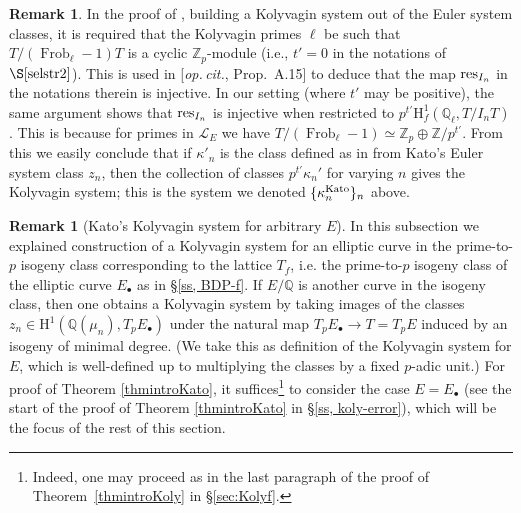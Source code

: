 \documentclass[10pt,reqno]{amsart}
\numberwithin{equation}{section}
\theoremstyle{plain}
\theoremstyle{definition}
\newtheorem{rmk}[thm]{Remark}
\theoremstyle{definition}
\theoremstyle{plain}
\theoremstyle{plain}
\theoremstyle{plain}
\theoremstyle{plain}
\theoremstyle{plain}
\theoremstyle{plain}
\newcommand{\Z}{\mathbb{Z}}
\newcommand{\Q}{\mathbb{Q}}
\DeclareMathOperator{\frob}{Frob}
\newcommand{\Lcal}{\mathcal{L}}
\newcommand{\rH}{\mathrm{H}}
\begin{document}
\begin{rmk} 
{
In the proof of \cite[Theorem~3.2.4]{mazrub}, building a  Kolyvagin system out of the Euler system classes, it is required that the Kolyvagin primes $\ell$ be such that $T/(\frob_\ell -1)T$ is a cyclic
$\Z_p$-module (i.e., $t'=0$ in the notations of $\S\ref{selstr2}$). This is used in [\emph{op.\,cit.}, Prop.~A.15] to deduce that the map ${\rm res}_{I_n}$ in the notations therein  is injective. In our setting (where $t'$ may be positive), the same argument shows that ${\rm res}_{I_n}$ is injective when  
restricted to $p^{t'}\rH^1_f(\Q_\ell,T/{I_n}T)$. This is because for primes in $\Lcal_E$ we have $T/(\frob_\ell -1)\simeq \Z_p \oplus \Z/p^{t'}$.
From this we easily conclude that if $\kappa'_n$ is the class defined as in \cite[(33)]{mazrub} from Kato's Euler system class $z_n$, then the collection of classes $p^{t'}\kappa_n'$ for varying $n$ gives the Kolyvagin system; this is the system we denoted $\{\kappa_n^{\rm Kato}\}_n$ above.
}
\end{rmk}


\begin{rmk}[Kato's Kolyvagin system for arbitrary $E$] {In this subsection we explained construction of a Kolyvagin system for an elliptic curve in the prime-to-$p$ isogeny class corresponding to the lattice $T_f$, i.e. the prime-to-$p$ isogeny class of the elliptic curve  $E_\bullet$ 
as in \S\ref{ss, BDP-f}.  
If $E/\Q$ is another curve in the isogeny class, then one obtains a Kolyvagin system by taking images of the classes $z_n\in\rH^1(\Q(\mu_n),T_pE_\bullet)$ under the natural map $T_pE_\bullet\rightarrow T=T_pE$ induced by an isogeny of minimal degree. (We take this as definition of the Kolyvagin system for $E$, which is well-defined up to multiplying the classes by a fixed $p$-adic unit.) For proof of Theorem \ref{thmintroKato}, it suffices\footnote{Indeed, one may proceed as in the last paragraph of the proof of Theorem~\ref{thmintroKoly} in \S\ref{sec:Kolyf}.} to consider the case 
 $E=E_\bullet$ (see the start of the proof of Theorem \ref{thmintroKato} in \S\ref{ss, koly-error}), which will be the focus of the rest of this section}. 
\end{rmk}
\end{document}
